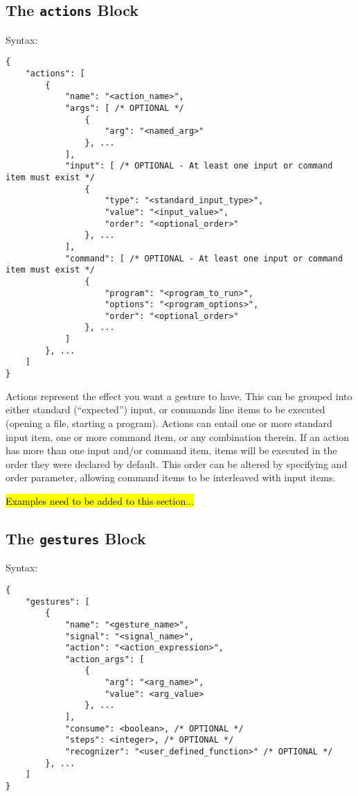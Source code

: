 \documentclass{article}
\begin{document}
\subsection{The \texttt{actions} Block}
Syntax:

\begin{Verbatim}[baselinestretch=1.0]
{
    "actions": [
        {
            "name": "<action_name>",
            "args": [ /* OPTIONAL */
                { 
                    "arg": "<named_arg>"
                }, ...
            ],
            "input": [ /* OPTIONAL - At least one input or command item must exist */
                {
                    "type": "<standard_input_type>",
                    "value": "<input_value>",
                    "order": "<optional_order>"
                }, ...
            ],
            "command": [ /* OPTIONAL - At least one input or command item must exist */
                {
                    "program": "<program_to_run>",
                    "options": "<program_options>",
                    "order": "<optional_order>"
                }, ...
            ]
        }, ...
    ]
}
\end{Verbatim}

Actions represent the effect you want a gesture to have.
This can be grouped into either standard (``expected'') input, or commands line items to be executed (opening a file, starting a program). Actions can entail one or more standard input item, one or more command item, or any combination therein. If an action has more than one input and/or command item, items will be executed in the order they were declared by default. This order can be altered by specifying and order parameter, allowing command items to be interleaved with input items.

\hl{Examples need to be added to this section...}

\subsection{The \texttt{gestures} Block}
Syntax:

\begin{Verbatim}[baselinestretch=1.0]
{
    "gestures": [
        {
            "name": "<gesture_name>",
            "signal": "<signal_name>",
            "action": "<action_expression>",
            "action_args": [
                {
                    "arg": "<arg_name>",
                    "value": <arg_value>
                }, ...
            ],
            "consume": <boolean>, /* OPTIONAL */
            "steps": <integer>, /* OPTIONAL */
            "recognizer": "<user_defined_function>" /* OPTIONAL */
        }, ...
    ]
}
\end{Verbatim}
\end{document}
